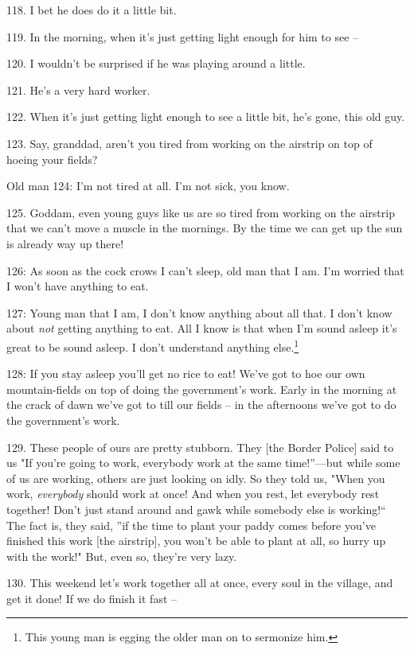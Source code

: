 118. I bet he does do it a little bit.

119. In the morning, when it's just getting light enough for him to see --

120. I wouldn't be surprised if he was playing around a little.


121. He's a very hard worker.

122. When it's just getting light enough to see a little bit, he's gone, this old
guy.

123. Say, granddad, aren't you tired from working on the airstrip on top of hoeing
your fields?

Old man 124: I'm not tired at all. I'm not sick, you know.

125. Goddam, even young guys like us are so tired from working on the airstrip
that we can't move a muscle in the mornings. By the time we can get up the sun
is already way up there!

 126: As soon as the cock crows I can't sleep, old man
that I am. I'm worried that I won't have anything to eat.

 127: Young man that I am, I don't know anything about
all that. I don't know about \textit{not} getting anything to eat. All I know is
that when I'm sound asleep it's great to be sound asleep. I don't understand anything
else.\footnote{This young man is egging the older man on to sermonize him.}

 128: If you stay asleep you'll get no rice to eat!
We've got to hoe our own mountain-fields on top of doing the government's work.
Early in the morning at the crack of dawn we've got to till our fields -- in the
afternoons we've got to do the government's work.

129. These people of ours are pretty stubborn. They [the Border Police] said to
us "If you're going to work, everybody work at the same time!''---but
while some of us are working, others are just looking on idly. So they told us,
"When you work, \textit{everybody} should work at once! And when you rest,
let everybody rest together! Don't just stand around and gawk while somebody else
is working!`` The fact is, they said, ''if the time to plant your
paddy comes before you've finished this work [the airstrip], you won't be able
to plant at all, so hurry up with the work!" But, even so, they're very
lazy.

130. This weekend let's work together all at once, every soul in the village, and
get it done! If we do finish it fast --

